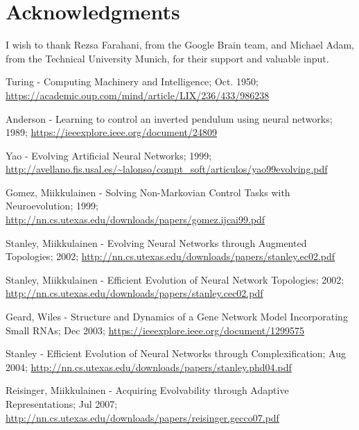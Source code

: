 \documentclass[journal, a4paper]{IEEEtran}
\begin{document}

\section{Acknowledgments}

I wish to thank Rezsa Farahani, from the Google Brain team, and Michael Adam, from the Technical University Munich, for their support and valuable input.




\begin{thebibliography}{5}

    Turing - Computing Machinery and Intelligence; Oct. 1950;
    \url{https://academic.oup.com/mind/article/LIX/236/433/986238}

    Anderson - Learning to control an inverted pendulum using neural networks; 1989;
    \url{https://ieeexplore.ieee.org/document/24809}

    Yao - Evolving Artificial Neural Networks; 1999;
    \url{http://avellano.fis.usal.es/~lalonso/compt_soft/articulos/yao99evolving.pdf}

    Gomez, Miikkulainen - Solving Non-Markovian Control Tasks with Neuroevolution; 1999;
    \url{http://nn.cs.utexas.edu/downloads/papers/gomez.ijcai99.pdf}

    Stanley, Miikkulainen - Evolving Neural Networks through Augmented Topologies; 2002;
    \url{http://nn.cs.utexas.edu/downloads/papers/stanley.ec02.pdf}

    Stanley, Miikkulainen - Efficient Evolution of Neural Network Topologies; 2002;
    \url{http://nn.cs.utexas.edu/downloads/papers/stanley.cec02.pdf}

    Geard, Wiles - Structure and Dynamics of a Gene Network Model Incorporating Small RNAs; Dec 2003;
    \url{https://ieeexplore.ieee.org/document/1299575}

    Stanley - Efficient Evolution of Neural Networks through Complexification; Aug 2004;
    \url{http://nn.cs.utexas.edu/downloads/papers/stanley.phd04.pdf}

    Reisinger, Miikkulainen - Acquiring Evolvability through Adaptive Representations; Jul 2007;
    \url{http://nn.cs.utexas.edu/downloads/papers/reisinger.gecco07.pdf}


\end{thebibliography}
\end{document}
